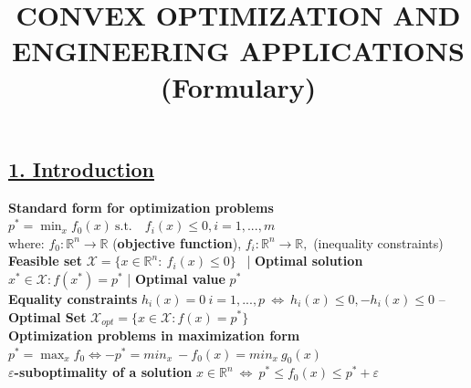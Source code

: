 \documentclass[a4paper]{article}
\title{
    \vspace{-1.5cm}
    \textbf{
        \large{
            CONVEX OPTIMIZATION AND ENGINEERING APPLICATIONS (Formulary)
   \vspace{-10ex}
        }
    }
}
\author{}
\date{}
\begin{document}
\maketitle
\thispagestyle{empty}
\vspace{0.15cm}
\subsection*{\underline{1. Introduction}}
\textbf{Standard form for optimization problems} $p^*=\min_{x} f_0(x) \ \text{s.t.} \quad f_i(x) \le 0, i=1,..., m$\\
where: $f_0: \mathbb{R}^n \to \mathbb{R}$ (\textbf{objective function}), $f_i: \mathbb{R}^n \to \mathbb{R}, $ (inequality constraints) \\
\textbf{Feasible set} $\mathcal{X} = \{x \in \mathbb{R}^n:\ f_i(x)\le 0\}$ \ |
\textbf{Optimal solution} $x^* \in \mathcal{X}: f(x^*)=p^*$ |
\textbf{Optimal value} $p^*$\\
\textbf{Equality constraints} $h_i(x)=0 \ i=1,...,p \ \iff \ h_i(x)\le 0, -h_i(x)\le 0$  --
\textbf{Optimal Set}  $\mathcal{X}_{opt} = \{x \in \mathcal{X} : f(x)=p^*\}$ \\
\textbf{Optimization problems in maximization form} $p^*=\max_{x} f_0 \iff -p^*=min_{x} \ -f_0(x) = min_{x} \ g_0(x)$\\
\textbf{$\varepsilon$-suboptimality of a solution} $x\in \mathbb{R}^n \ \iff \ p^* \le f_0(x) \le p^*+\varepsilon$
\end{document}
